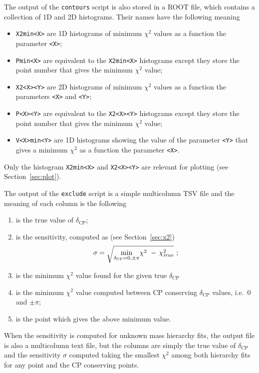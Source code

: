 \documentclass[a4paper, 11pt]{article}
\newcommand{\refsec}[1]{Section~\ref{#1}}
\begin{document}
The output of the \texttt{contours} script is also stored in a ROOT file, which %
contains a collection of 1D and 2D histograms.
Their names have the following meaning
\begin{itemize}
	\item \texttt{X2min<X>} are 1D histograms of minimum $\chi^2$ values as a function %
		the parameter \texttt{<X>};
	\item \texttt{Pmin<X>} are equivalent to the \texttt{X2min<X>} histograms except they %
		store the point number that gives the minimum $\chi^2$ value;
	\item \texttt{X2<X><Y>} are 2D histograms of minimum $\chi^2$ values as a function %
		the parameters \texttt{<X>} and \texttt{<Y>};
	\item \texttt{P<X><Y>} are equivalent to the \texttt{X2<X><Y>} histograms except they %
		store the point number that gives the minimum $\chi^2$ value;
	\item \texttt{V<X>min<Y>} are 1D histograms showing the value of the parameter \texttt{<Y>} %
		that gives a minimum $\chi^2$ as a function the parameter \texttt{<X>}.
\end{itemize}
Only the histogram \texttt{X2min<X>} and \texttt{X2<X><Y>} are relevant for plotting (see \refsec{sec:plot}).

The output of the \texttt{exclude} script is a simple multicolumn TSV file %
and the meaning of each column is the following
\begin{enumerate}
	\item is the true value of $\delta_\text{CP}$;
	\item is the sensitivity, computed as (see \refsec{sec:x2})
		\[
			\sigma = \sqrt{\min_{\delta_\text{CP} = 0,\pm\pi}\! \chi^2\  -\,\chi^2_\text{\emph{true}}}\ ;
		\]
	\item is the minimum $\chi^2$ value found for the given true $\delta_\text{CP}$
	\item is the minimum $\chi^2$ value computed between CP conserving $\delta_\text{CP}$ values, %
		i.e.\ $0$ and $\pm\pi$;
	\item is the point which gives the above minimum value.
\end{enumerate}
When the sensitivity is computed for unknown mass hierarchy fits, the output file is %
also a multicolumn text file, but the columns are simply the true value of $\delta_\text{CP}$ %
and the sensitivity $\sigma$ computed taking the smallest $\chi^2$ among both hierarchy fits %
for any point and the CP conserving points.
\end{document}
